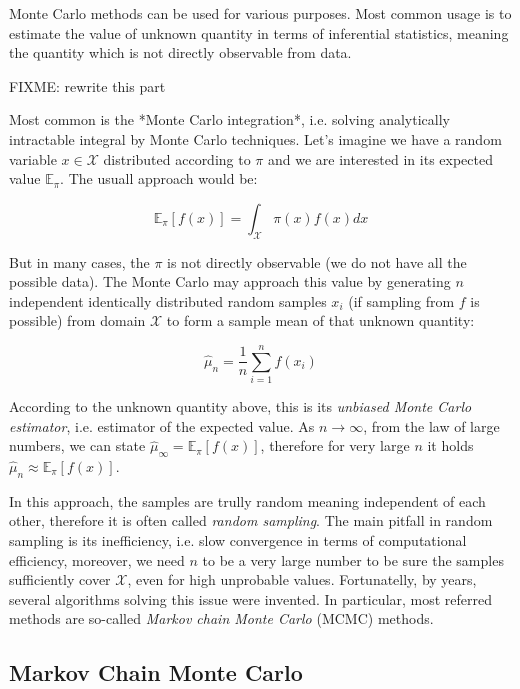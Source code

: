 \documentclass[
  digital, %
  oneside, %
  lof,     %
  lot,     %
]{fithesis4}
\begin{document}
Monte Carlo methods can be used for various 
purposes. 
Most common usage is to estimate the value of 
unknown quantity in terms of inferential 
statistics, meaning the quantity which is not 
directly observable from data.

FIXME: rewrite this part

Most common is the *Monte Carlo integration*, 
i.e. solving analytically intractable integral 
by Monte Carlo techniques. 
Let's imagine we have a random variable 
$x \in \mathcal{X}$ distributed according to 
$\pi$ and we are interested in its expected 
value $\mathbb{E}_{\pi}$. 
The usuall approach would be:

\begin{equation}
\mathbb{E}_{\pi}\left[ f(x) \right] = \int_{\mathcal{X}} \pi \left( x \right) f \left( x \right) dx
\end{equation}

But in many cases, the $\pi$ is not directly 
observable (we do not have all the possible data). 
The Monte Carlo may approach this value by 
generating $n$ independent identically distributed 
random samples $x_i$ (if sampling from $f$ is 
possible) from domain $\mathcal{X}$ to form a 
sample mean of that unknown quantity:

\begin{equation}
\hat{\mu}_n = \frac{1}{n} \sum_{i=1}^{n} f \left( x_i \right)
\end{equation}

According to the unknown quantity above, this 
is its \textit{unbiased Monte Carlo estimator}, i.e. 
estimator of the expected value. 
As $n \to \infty$, from the law of large numbers, 
we can state 
$\hat{\mu}_{\infty} = \mathbb{E}_{\pi}\left[ f(x) \right]$, 
therefore for very large $n$ it holds 
$\hat{\mu}_n \approx \mathbb{E}_{\pi}\left[ f(x) \right]$.

In this approach, the samples are trully 
random meaning independent of each other, 
therefore it is often called 
\textit{random sampling}. 
The main pitfall in random sampling is its 
inefficiency, i.e. slow convergence in terms 
of computational efficiency, moreover, we 
need $n$ to be a very large number to be 
sure the samples sufficiently cover 
$\mathcal{X}$, even for high unprobable values. 
Fortunatelly, by years, several algorithms 
solving this issue were invented. 
In particular, most referred methods are 
so-called \textit{Markov chain Monte Carlo} (MCMC) 
methods.


\subsection{Markov Chain Monte Carlo}
\end{document}
